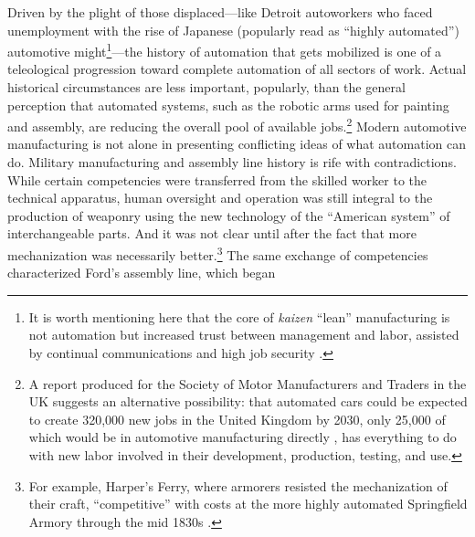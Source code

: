 


Driven by the plight of those displaced---like Detroit
autoworkers who faced unemployment with the rise of
Japanese (popularly read as ``highly automated'') automotive
might\footnote{It is worth mentioning here that the core of
  \emph{kaizen} ``lean'' manufacturing is not automation but increased trust between management
  and labor, assisted by continual communications and high job
  security \cite[p. 198--199]{nyeAmericas}.}---the history of
automation that gets mobilized is one of a teleological progression
toward complete automation of all sectors of work. Actual historical 
circumstances are less important, popularly, than the general
perception that automated 
systems, such as the robotic arms used for painting and assembly, are
reducing the overall pool of available jobs.\footnote{A report produced for the Society of Motor
Manufacturers and Traders in the UK suggests an alternative
possibility: that automated cars could be 
expected to create 320,000 new jobs in the United Kingdom by 2030, only 25,000 of
which would be in automotive manufacturing directly
\cite{toveyCreate}, has everything to do with new labor involved in their
development, production, testing, and use.}
Modern automotive manufacturing is not alone in presenting conflicting ideas
of what automation can do. Military manufacturing and assembly line
history is rife with contradictions. While certain competencies were
transferred from the skilled worker
to the technical apparatus, human oversight and operation was still
integral to the production of weaponry using the new technology of the
``American system'' of interchangeable parts. And it was
not clear until after the fact that more mechanization was necessarily
better.\footnote{For example, Harper's Ferry, where armorers resisted the
  mechanization of their craft, ``competitive'' with
costs at the more highly automated Springfield Armory through the mid
1830s \cite[p. 324]{roesmithHarpers}.} The same exchange of
competencies characterized Ford's assembly line, which began
